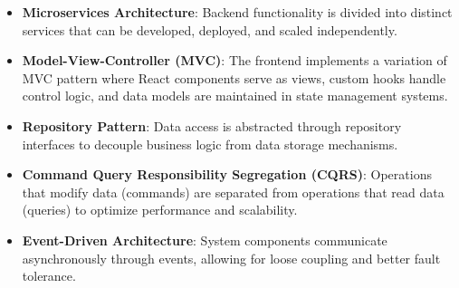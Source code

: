 \documentclass[12pt,a4paper]{article}
\begin{document}
\begin{itemize}
    \item \textbf{Microservices Architecture}: Backend functionality is divided into distinct services that can be developed, deployed, and scaled independently.
    
    \item \textbf{Model-View-Controller (MVC)}: The frontend implements a variation of MVC pattern where React components serve as views, custom hooks handle control logic, and data models are maintained in state management systems.
    
    \item \textbf{Repository Pattern}: Data access is abstracted through repository interfaces to decouple business logic from data storage mechanisms.
    
    \item \textbf{Command Query Responsibility Segregation (CQRS)}: Operations that modify data (commands) are separated from operations that read data (queries) to optimize performance and scalability.
    
    \item \textbf{Event-Driven Architecture}: System components communicate asynchronously through events, allowing for loose coupling and better fault tolerance.
\end{itemize}
\end{document}
